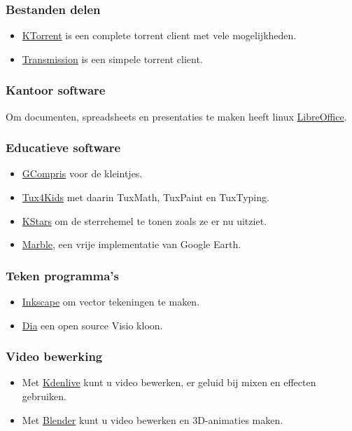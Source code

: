 \subsubsection{Bestanden delen}
\begin{itemize}
	\item \href{http://www.ktorrent.org/}{KTorrent} is een complete torrent client met vele mogelijkheden.
	\item \href{https://www.transmissionbt.com/}{Transmission} is een simpele torrent client.
\end{itemize}

\subsubsection{Kantoor software}
Om documenten, spreadsheets en presentaties te maken heeft linux \href{https://www.libreoffice.org/}{LibreOffice}.

\subsubsection{Educatieve software}
\begin{itemize}
	\item \href{http://gcompris.net/index-en.html}{GCompris} voor de kleintjes.
	\item \href{http://tux4kids.alioth.debian.org/}{Tux4Kids} met daarin TuxMath, TuxPaint en TuxTyping.
	\item \href{https://edu.kde.org/kstars/}{KStars} om de sterrehemel te tonen zoals ze er nu uitziet.
	\item \href{https://edu.kde.org/marble/}{Marble}, een vrije implementatie van Google Earth.
\end{itemize}

\subsubsection{Teken programma's}

\begin{itemize}
	\item \href{https://inkscape.org/nl/}{Inkscape} om vector tekeningen te maken.
	\item \href{https://wiki.gnome.org/Apps/Dia}{Dia} een open source Visio kloon. 
\end{itemize}

\subsubsection{Video bewerking}
\begin{itemize}
	\item Met \href{https://kdenlive.org/}{Kdenlive} kunt u video bewerken, er geluid bij mixen en effecten gebruiken.
	\item Met \href{http://www.blender.org/}{Blender} kunt u video bewerken en 3D-animaties maken.
\end{itemize}

